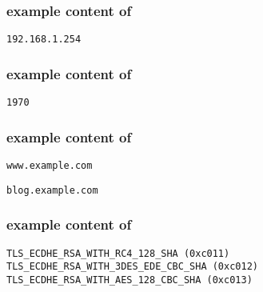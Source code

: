 \hypertarget{portscanformat}{}
\subsubsection*{example content of \texttt{\hyperlink{cp1portscan}{\fileportscan}}}
\begin{mdframed}
\begin{Verbatim}
192.168.1.254
\end{Verbatim}
\end{mdframed}

\hypertarget{yearformat}{}
\subsubsection*{example content of \texttt{\hyperlink{cp1year}{\fileyear}}}
\begin{mdframed}
\begin{Verbatim}
1970
\end{Verbatim}
\end{mdframed}

\hypertarget{domainformat}{}
\subsubsection*{example content of \texttt{\hyperlink{cp1domain}{\filedomain}}}
\begin{mdframed}
\begin{Verbatim}
www.example.com
\end{Verbatim}
\end{mdframed}
\vspace{-15pt}
\begin{mdframed}
\begin{Verbatim}
blog.example.com
\end{Verbatim}
\end{mdframed}

\hypertarget{cslistformat}{}
\subsubsection*{example content of \texttt{\hyperlink{cp1cslist}{\filecslist}}}
\begin{mdframed}
\begin{Verbatim}
TLS_ECDHE_RSA_WITH_RC4_128_SHA (0xc011)
TLS_ECDHE_RSA_WITH_3DES_EDE_CBC_SHA (0xc012)
TLS_ECDHE_RSA_WITH_AES_128_CBC_SHA (0xc013)
\end{Verbatim}
\end{mdframed}

\hypertarget{servercsformat}{}
